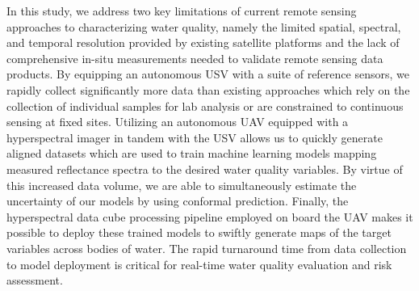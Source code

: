\documentclass[remotesensing,article,submit,pdftex,moreauthors]{Definitions/mdpi}
\begin{document}
In this study, we address two key limitations of current remote sensing approaches to characterizing water quality, namely the limited spatial, spectral, and temporal resolution provided by existing satellite platforms and the lack of comprehensive in-situ measurements needed to validate remote sensing data products. By equipping an autonomous USV with a suite of reference sensors, we rapidly collect significantly more data than existing approaches which rely on the collection of individual samples for lab analysis or are constrained to continuous sensing at fixed sites. Utilizing an autonomous UAV equipped with a hyperspectral imager in tandem with the USV allows us to quickly generate aligned datasets which are used to train machine learning models mapping measured reflectance spectra to the desired water quality variables. By virtue of this increased data volume, we are able to simultaneously estimate the uncertainty of our models by using conformal prediction. Finally, the hyperspectral data cube processing pipeline employed on board the UAV makes it possible to deploy these trained models to swiftly generate maps of the target variables across bodies of water. The rapid turnaround time from data collection to model deployment is critical for real-time water quality evaluation and risk assessment. 



\vspace{6pt} 



\end{document}
